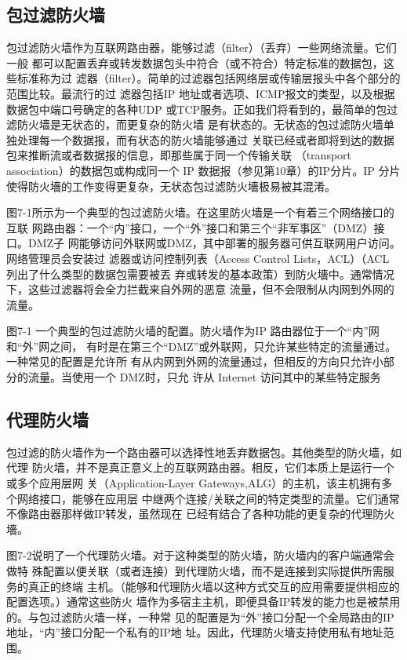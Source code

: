 \subsection{包过滤防火墙}

包过滤防火墙作为互联网路由器，能够过滤（filter）（丢弃）一些网络流量。它们一般
都可以配置丢弃或转发数据包头中符合（或不符合）特定标准的数据包，这些标准称为过
滤器（filter）。简单的过滤器包括网络层或传输层报头中各个部分的范围比较。最流行的过
滤器包括IP 地址或者选项、ICMP报文的类型，以及根据数据包中端口号确定的各种UDP
或TCP服务。正如我们将看到的，最简单的包过滤防火墙是无状态的，而更复杂的防火墙
是有状态的。无状态的包过滤防火墙单独处理每一个数据报，而有状态的防火墙能够通过
关联已经或者即将到达的数据包来推断流或者数据报的信息，即那些属于同一个传输关联
（transport association）的数据包或构成同一个 IP 数据报（参见第10章）的IP分片。IP 分片
使得防火墻的工作变得更复杂，无状态包过滤防火墻极易被其混淆。

图7-1所示为一个典型的包过滤防火墙。在这里防火墙是一个有着三个网络接口的互联
网路由器：一个“内”接口，一个“外”接口和第三个“非军事区”（DMZ）接口。DMZ子
网能够访问外联网或DMZ，其中部署的服务器可供互联网用户访问。网络管理员会安装过
滤器或访问控制列表（Access Control Lists，ACL）（ACL 列出了什么类型的数据包需要被丟
弃或转发的基本政策）到防火墻中。通常情况下，这些过滤器将会全力拦截来自外网的恶意
流量，但不会限制从内网到外网的流量。

图7-1 一个典型的包过滤防火墙的配置。防火墙作为IP 路由器位于一个“内”网和“外”网之间，
有时是在第三个“DMZ”或外联网，只允许某些特定的流量通过。一种常见的配置是允许所
有从内网到外网的流量通过，但相反的方向只允许小部分的流量。当使用一个 DMZ时，只允
许从 Internet 访问其中的某些特定服务

\subsection{代理防火墙}

包过滤的防火墙作为一个路由器可以选择性地丢弃数据包。其他类型的防火墙，如代理
防火墙，并不是真正意义上的互联网路由器。相反，它们本质上是运行一个或多个应用层网
关（Application-Layer Gateways,ALG）的主机，该主机拥有多个网络接口，能够在应用层
中继两个连接/关联之间的特定类型的流量。它们通常不像路由器那样做IP转发，虽然现在
已经有结合了各种功能的更复杂的代理防火墻。

图7-2说明了一个代理防火墙。对于这种类型的防火墙，防火墙内的客户端通常会做特
殊配置以便关联（或者连接）到代理防火墙，而不是连接到实际提供所需服务的真正的终端
主机。（能够和代理防火墙以这种方式交互的应用需要提供相应的配置选项。）通常这些防火
墙作为多宿主主机，即便具备IP转发的能力也是被禁用的。与包过滤防火墙一样，一种常
见的配置是为“外”接口分配一个全局路由的IP 地址，“内”接口分配一个私有的IP地
址。因此，代理防火墻支持使用私有地址范围。

